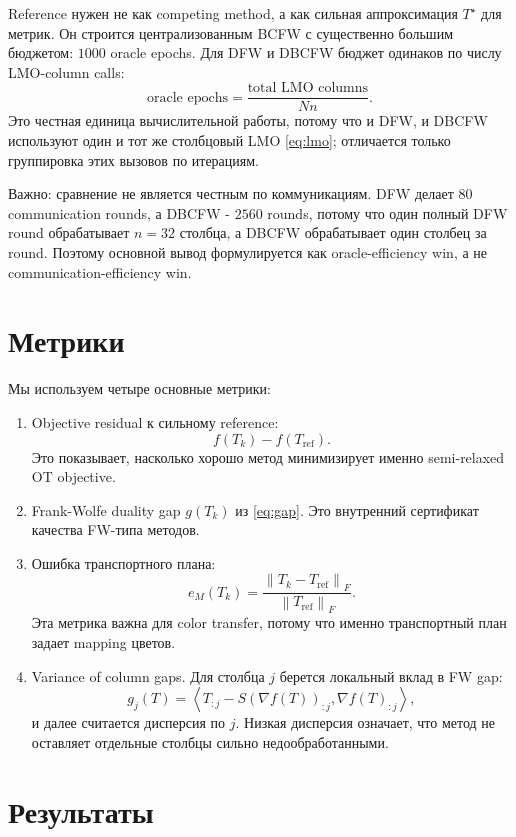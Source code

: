 \documentclass[11pt,a4paper]{article}
\newcommand{\1}{\mathbf{1}}
\newcommand{\inner}[2]{\left\langle #1,#2\right\rangle}
\newcommand{\norm}[1]{\left\lVert #1\right\rVert}
\begin{document}
Reference нужен не как competing method, а как сильная аппроксимация $T^\star$ для метрик. Он строится централизованным BCFW с существенно большим бюджетом: $1000$ oracle epochs. Для DFW и DBCFW бюджет одинаков по числу LMO-column calls:
\[
  \text{oracle epochs}
  =
  \frac{\text{total LMO columns}}{Nn}.
\]
Это честная единица вычислительной работы, потому что и DFW, и DBCFW используют один и тот же столбцовый LMO \eqref{eq:lmo}; отличается только группировка этих вызовов по итерациям.

Важно: сравнение не является честным по коммуникациям. DFW делает $80$ communication rounds, а DBCFW - $2560$ rounds, потому что один полный DFW round обрабатывает $n=32$ столбца, а DBCFW обрабатывает один столбец за round. Поэтому основной вывод формулируется как oracle-efficiency win, а не communication-efficiency win.

\section{Метрики}

Мы используем четыре основные метрики:
\begin{enumerate}
  \item Objective residual к сильному reference:
  \[
    f(T_k)-f(T_{\mathrm{ref}}).
  \]
  Это показывает, насколько хорошо метод минимизирует именно semi-relaxed OT objective.

  \item Frank-Wolfe duality gap $g(T_k)$ из \eqref{eq:gap}. Это внутренний сертификат качества FW-типа методов.

  \item Ошибка транспортного плана:
  \[
    e_M(T_k)=
    \frac{\norm{T_k-T_{\mathrm{ref}}}_F}{\norm{T_{\mathrm{ref}}}_F}.
  \]
  Эта метрика важна для color transfer, потому что именно транспортный план задает mapping цветов.

  \item Variance of column gaps. Для столбца $j$ берется локальный вклад в FW gap:
  \[
    g_j(T)=\inner{T_{:j}-S(\nabla f(T))_{:j}}{\nabla f(T)_{:j}},
  \]
  и далее считается дисперсия по $j$. Низкая дисперсия означает, что метод не оставляет отдельные столбцы сильно недообработанными.
\end{enumerate}

\section{Результаты}
\end{document}
